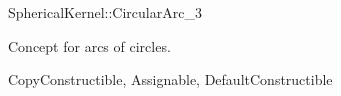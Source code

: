 \begin{ccRefConcept}{SphericalKernel::CircularArc_3}

Concept for arcs of circles.

\ccRefines
CopyConstructible, Assignable, DefaultConstructible

\ccHasModels
{}
\end{ccRefConcept}
